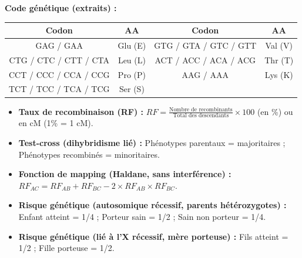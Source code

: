 \documentclass[11pt]{article}
\begin{document}
\begin{exercice}
\textbf{Code génétique (extraits) :}
\begin{center}
\begin{tabular}{|c|c|c|c|}\hline
\rowcolor{popblueL} Codon & AA & Codon & AA \\ \hline
GAG / GAA & Glu (E) & GTG / GTA / GTC / GTT & Val (V) \\ \hline
CTG / CTC / CTT / CTA & Leu (L) & ACT / ACC / ACA / ACG & Thr (T) \\ \hline
CCT / CCC / CCA / CCG & Pro (P) & AAG / AAA & Lys (K) \\ \hline
TCT / TCC / TCA / TCG & Ser (S) & & \\ \hline
\end{tabular}
\end{center}
\end{exercice}

\begin{aretenir}
\begin{itemize}
    \item \textbf{Taux de recombinaison (RF) :} $RF = \frac{\text{Nombre de recombinants}}{\text{Total des descendants}} \times 100$ (en \%) ou en cM (1\% = 1 cM).
    \item \textbf{Test-cross (dihybridisme lié) :} Phénotypes parentaux = majoritaires ; Phénotypes recombinés = minoritaires.
    \item \textbf{Fonction de mapping (Haldane, sans interférence) :} $RF_{AC} = RF_{AB} + RF_{BC} - 2 \times RF_{AB} \times RF_{BC}$.
    \item \textbf{Risque génétique (autosomique récessif, parents hétérozygotes) :} Enfant atteint = 1/4 ; Porteur sain = 1/2 ; Sain non porteur = 1/4.
    \item \textbf{Risque génétique (lié à l'X récessif, mère porteuse) :} Fils atteint = 1/2 ; Fille porteuse = 1/2.
\end{itemize}
\end{aretenir}
\end{document}
